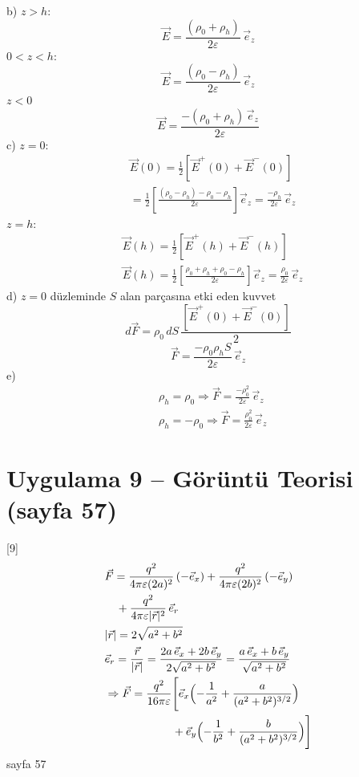 \documentclass[11pt,a4paper]{article}
\begin{document}
b) $z>h$:
\[ \vec E=\frac{(\rho_0+\rho_h)}{2\varepsilon}\,\vec e_z \]
$0<z<h$:
\[ \vec E=\frac{(\rho_0-\rho_h)}{2\varepsilon}\,\vec e_z \]
$z<0$
\[ \vec E=\frac{-(\rho_0+\rho_h)\,\vec e_z}{2\varepsilon} \]
c) $z=0$:
\begin{align*}
&\vec E(0)=\tfrac12\left[\vec E^{+}(0)+\vec E^{-}(0)\right]\\
&=\frac12\left[\frac{(\rho_0-\rho_h)-\rho_0-\rho_h}{2\varepsilon}\right]\vec e_z=\frac{-\rho_h}{2\varepsilon}\,\vec e_z
\end{align*}
$z=h$:
\begin{align*}
&\vec E(h)=\tfrac12\left[\vec E^{+}(h)+\vec E^{-}(h)\right]\\
&\vec E(h)=\frac12\left[\frac{\rho_0+\rho_h+\rho_0-\rho_h}{2\varepsilon}\right]\vec e_z=\frac{\rho_0}{2\varepsilon}\,\vec e_z
\end{align*}
d) $z=0$ düzleminde $S$ alan parçasına etki eden kuvvet
\[ d\vec F=\rho_0\,dS\,\frac{\left[\vec E^{+}(0)+\vec E^{-}(0)\right]}{2} \]
\[ \vec F=\frac{-\rho_0\rho_hS}{2\varepsilon}\,\vec e_z \]
e)
\begin{align*}
&\rho_h=\rho_0\Rightarrow\vec F=\frac{-\rho_0^2}{2\varepsilon}\,\vec e_z\\
&\rho_h=-\rho_0\Rightarrow\vec F=\frac{\rho_0^2}{2\varepsilon}\,\vec e_z
\end{align*}

\section{Uygulama 9 -- Görüntü Teorisi (sayfa 57)}
[9]
\begin{align*}
&\vec F=\frac{q^2}{4\pi\varepsilon(2a)^2}\,(-\vec e_x)+\frac{q^2}{4\pi\varepsilon(2b)^2}\,(-\vec e_y)\\
&\quad+\frac{q^2}{4\pi\varepsilon|\vec r|^2}\,\vec e_r\\
&|\vec r|=2\sqrt{a^2+b^2}\\
&\vec e_r=\frac{\vec r}{|\vec r|}=\frac{2a\,\vec e_x+2b\,\vec e_y}{2\sqrt{a^2+b^2}}=\frac{a\,\vec e_x+b\,\vec e_y}{\sqrt{a^2+b^2}}\\
&\Rightarrow\vec F=\frac{q^2}{16\pi\varepsilon}\Biggl[\vec e_x\Bigl(-\frac{1}{a^2}+\frac{a}{(a^2+b^2)^{3/2}}\Bigr)\\
&\qquad\qquad\qquad+\vec e_y\Bigl(-\frac{1}{b^2}+\frac{b}{(a^2+b^2)^{3/2}}\Bigr)\Biggr]
\end{align*}
sayfa 57
\end{document}
